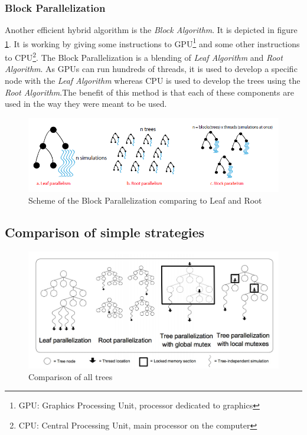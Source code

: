 \subsubsection{Block Parallelization}

Another efficient hybrid algorithm is the \emph{Block Algorithm}\cite{GPU}.  It is depicted in figure \ref{block}. It is working by giving some instructions to GPU\footnote{GPU: Graphics Processing Unit, processor dedicated to graphics} and some other instructions to CPU\footnote{CPU: Central Processing Unit, main processor on the computer}. The Block Parallelization is a blending of \emph{Leaf Algorithm} and \emph{Root Algorithm}. As GPUs can run hundreds of threads, it is used to develop a specific node with the \emph{Leaf Algorithm} whereas CPU is used to develop the trees using the \emph{Root Algorithm}.The benefit of this method is that each of these components are used in the way they were meant to be used.

\begin{figure}[!h] 
\centerline{\includegraphics[scale=0.60]{4_Strategies_and_state_of_the_art/4.1Strategy_of_root_parallelization_Mikail/block.png}}
   \caption{\label{étiquette} Scheme of the Block Parallelization comparing to Leaf and Root}
\label{block}
\end{figure}

\subsection{Comparison of simple strategies}
\begin{figure}[!h] 
\centerline{\includegraphics[scale=0.60]{4_Strategies_and_state_of_the_art/4.1Strategy_of_root_parallelization_Mikail/impara.png}}
   \caption{\label{étiquette} Comparison of all trees}
\label{comp_algo}
\end{figure}

